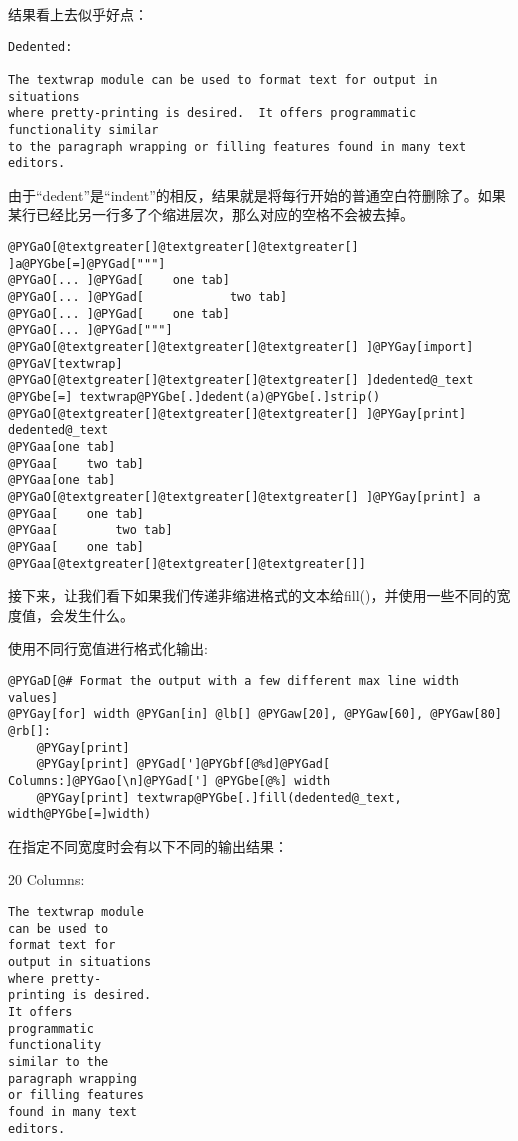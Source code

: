 \documentclass[a4paper,10pt,english]{manual}
\begin{document}
结果看上去似乎好点：

\begin{Verbatim}[commandchars=@\[\]]
Dedented:

The textwrap module can be used to format text for output in situations
where pretty-printing is desired.  It offers programmatic functionality similar
to the paragraph wrapping or filling features found in many text editors.
\end{Verbatim}

由于“dedent”是“indent”的相反，结果就是将每行开始的普通空白符删除了。如果某行已经比另一行多了个缩进层次，那么对应的空格不会被去掉。

\begin{Verbatim}[commandchars=@\[\]]
@PYGaO[@textgreater[]@textgreater[]@textgreater[] ]a@PYGbe[=]@PYGad["""]
@PYGaO[... ]@PYGad[    one tab]
@PYGaO[... ]@PYGad[            two tab]
@PYGaO[... ]@PYGad[    one tab]
@PYGaO[... ]@PYGad["""]
@PYGaO[@textgreater[]@textgreater[]@textgreater[] ]@PYGay[import] @PYGaV[textwrap]
@PYGaO[@textgreater[]@textgreater[]@textgreater[] ]dedented@_text @PYGbe[=] textwrap@PYGbe[.]dedent(a)@PYGbe[.]strip()
@PYGaO[@textgreater[]@textgreater[]@textgreater[] ]@PYGay[print] dedented@_text
@PYGaa[one tab]
@PYGaa[    two tab]
@PYGaa[one tab]
@PYGaO[@textgreater[]@textgreater[]@textgreater[] ]@PYGay[print] a
@PYGaa[    one tab]
@PYGaa[        two tab]
@PYGaa[    one tab]
@PYGaa[@textgreater[]@textgreater[]@textgreater[]]
\end{Verbatim}

接下来，让我们看下如果我们传递非缩进格式的文本给fill()，并使用一些不同的宽度值，会发生什么。

使用不同行宽值进行格式化输出:

\begin{Verbatim}[commandchars=@\[\]]
@PYGaD[@# Format the output with a few different max line width values]
@PYGay[for] width @PYGan[in] @lb[] @PYGaw[20], @PYGaw[60], @PYGaw[80] @rb[]:
    @PYGay[print]
    @PYGay[print] @PYGad[']@PYGbf[@%d]@PYGad[ Columns:]@PYGao[\n]@PYGad['] @PYGbe[@%] width
    @PYGay[print] textwrap@PYGbe[.]fill(dedented@_text, width@PYGbe[=]width)
\end{Verbatim}

在指定不同宽度时会有以下不同的输出结果：

20 Columns:

\begin{Verbatim}[commandchars=@\[\]]
The textwrap module
can be used to
format text for
output in situations
where pretty-
printing is desired.
It offers
programmatic
functionality
similar to the
paragraph wrapping
or filling features
found in many text
editors.
\end{Verbatim}
\end{document}
